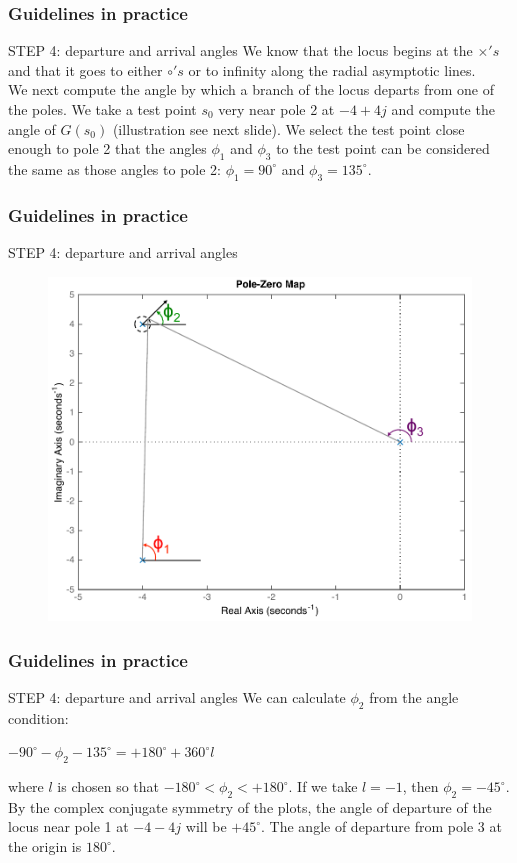 \begin{frame}
	\frametitle{Guidelines in practice}
	\begin{block}{STEP 4: departure and arrival angles}
		We know that the locus begins at the $\times's$ and that it goes to either $\circ's$ or to infinity along the radial asymptotic lines.\\
		\vspace{1em}
		We next compute the angle by which a branch of the locus departs from one of the poles. We take a test point $s_0$ very near pole 2 at $-4+4j$ and compute the angle of $G(s_0)$ (illustration see next slide). We select the test point close enough to pole 2 that the angles $\phi_1$ and $\phi_3$ to the test point can be considered the same as those angles to pole 2: $\phi_1 = 90^{\circ}$ and $\phi_3 = 135^{\circ}$. 
	\end{block}
\end{frame}

\begin{frame}
	\frametitle{Guidelines in practice}
	\begin{block}{STEP 4: departure and arrival angles}
		\begin{figure}
			\centering
			\includegraphics[width=0.6\linewidth]{how_to_draw_ex4}
		\end{figure}
	\end{block}
\end{frame}

\begin{frame}
\frametitle{Guidelines in practice}	
	\begin{block}{STEP 4: departure and arrival angles}
		We can calculate $\phi_2$ from the angle condition:
		\begin{center}
			$-90^{\circ} - \phi_2 - 135^{\circ} = +180^{\circ} + 360^{\circ}l$
		\end{center}
		where $l$ is chosen so that $-180^{\circ} < \phi_2 < +180^{\circ}$. If we take $l = -1$, then $\phi_2 = -45^{\circ}$.\\
		\vspace{1em}
		By the complex conjugate symmetry of the plots, the angle of departure of the locus near pole 1 at $-4 - 4j$ will be $+45^{\circ}$. The angle of departure from pole 3 at the origin is $180^{\circ}$.
	\end{block}
\end{frame}

